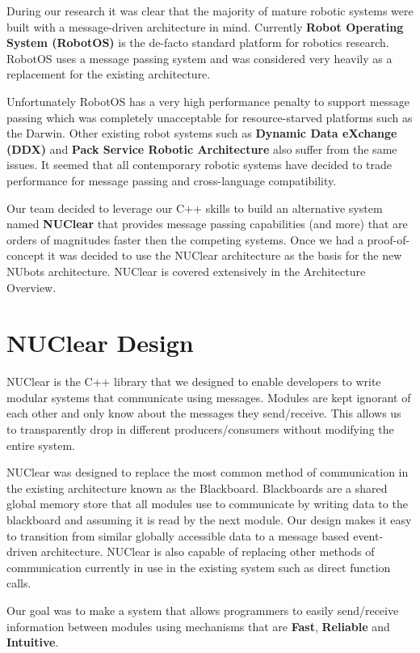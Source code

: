 \documentclass[english,12pt]{scrartcl}
\begin{document}
				During our research it was clear that the majority of mature robotic systems were built with a message-driven architecture in mind. 
				Currently \textbf{Robot Operating System (RobotOS)} is the de-facto standard platform for robotics research.
				RobotOS uses a message passing system and was considered very heavily as a replacement for the existing architecture.
				
				Unfortunately RobotOS has a very high performance penalty to support message passing which was completely unacceptable for resource-starved platforms such as the Darwin. 
				Other existing robot systems such as \textbf{Dynamic Data eXchange (DDX)} and \textbf{Pack Service Robotic Architecture} also suffer from the same issues. It seemed that all contemporary robotic systems have decided to trade performance for message passing and cross-language compatibility.
				
				Our team decided to leverage our C++ skills to build an alternative system named \textbf{NUClear} that provides message passing capabilities (and more) that are orders of magnitudes faster then the competing systems. 
				Once we had a proof-of-concept it was decided to use the NUClear architecture as the basis for the new NUbots architecture. NUClear is covered extensively in the Architecture Overview.
		
	\section{NUClear Design}
		NUClear is the C++ library that we designed to enable developers to write modular systems that communicate using messages. 
		Modules are kept ignorant of each other and only know about the messages they send/receive. 
		This allows us to transparently drop in different producers/consumers without modifying the entire system.
		
		NUClear was designed to replace the most common method of communication in the existing architecture known as the Blackboard.
		Blackboards are a shared global memory store that all modules use to communicate by writing data to the blackboard and assuming it is read by the next module.
		Our design makes it easy to transition from similar globally accessible data to a message based event-driven architecture.
		NUClear is also capable of replacing other methods of communication currently in use in the existing system such as direct function calls.
		
		Our goal was to make a system that allows programmers to easily send/receive information between modules using mechanisms that are \textbf{Fast}, \textbf{Reliable} and \textbf{Intuitive}.
\end{document}
